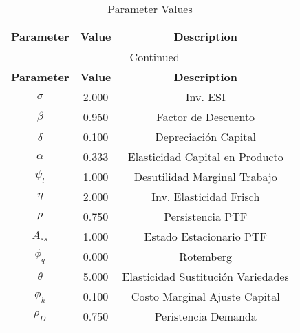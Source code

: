 \begin{center}
\begin{longtable}{ccc}
\caption{Parameter Values}\\%
\toprule%
\multicolumn{1}{c}{\textbf{Parameter}} &
\multicolumn{1}{c}{\textbf{Value}} &
 \multicolumn{1}{c}{\textbf{Description}}\\%
\midrule%
\endfirsthead
\multicolumn{3}{c}{{\tablename} \thetable{} -- Continued}\\%
\midrule%
\multicolumn{1}{c}{\textbf{Parameter}} &
\multicolumn{1}{c}{\textbf{Value}} &
  \multicolumn{1}{c}{\textbf{Description}}\\%
\midrule%
\endhead
$\sigma$ 	 & 	 2.000 	 & 	 Inv. ESI\\
$\beta$ 	 & 	 0.950 	 & 	 Factor de Descuento\\
$\delta$ 	 & 	 0.100 	 & 	 Depreciación Capital\\
$\alpha$ 	 & 	 0.333 	 & 	 Elasticidad Capital en Producto\\
$\psi_l$ 	 & 	 1.000 	 & 	 Desutilidad Marginal Trabajo\\
$\eta$ 	 & 	 2.000 	 & 	 Inv. Elasticidad Frisch\\
$\rho$ 	 & 	 0.750 	 & 	 Persistencia PTF\\
$A_{ss}$ 	 & 	 1.000 	 & 	 Estado Estacionario PTF\\
$\phi_q$ 	 & 	 0.000 	 & 	 Rotemberg\\
$\theta$ 	 & 	 5.000 	 & 	 Elasticidad Sustitución Variedades\\
$\phi_k$ 	 & 	 0.100 	 & 	 Costo Marginal Ajuste Capital\\
$\rho_D$ 	 & 	 0.750 	 & 	 Peristencia Demanda\\
\bottomrule%
\end{longtable}
\end{center}
